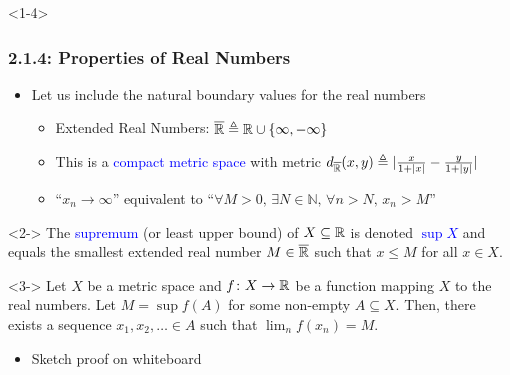 \documentclass[10pt,english,aspectratio=169]{beamer}
\begin{document}
\begin{frame}<1-4>
\frametitle{2.1.4: Properties of Real Numbers}

\begin{itemize}
\setlength\itemsep{3mm}
\item<1-> Let us include the natural boundary values for the real numbers \vspace{1mm}

\begin{itemize} 
  \setlength\itemsep{1.5mm}
  \item Extended Real Numbers: $\overline{\mathbb{R}} \triangleq \mathbb{R} \cup \{ \infty,-\infty\}$
  \item This is a \textcolor{blue}{compact metric space} with metric $d_{\overline{\mathbb{R}}} (x,y) \triangleq |\frac{x}{1+|x|} - \frac{y}{1+|y|}|$
  \item ``$x_n \to \infty$'' equivalent to ``$\forall M>0, \, \exists N\in \mathbb{N}, \, \forall n>N, \, x_n > M$''
\end{itemize}
\end{itemize}

\begin{definition}<2->
The \textcolor{blue}{supremum} (or least upper bound) of $X\subseteq \mathbb{R}$ is denoted \textcolor{blue}{$\sup X$} and equals the smallest extended real number $M \in \overline{\mathbb{R}}$ such that $x\leq M$ for all $x\in X$.
\end{definition}

\begin{lemma}<3->
Let $X$ be a metric space and $f \colon X\rightarrow \mathbb{R}$ be a function mapping $X$ to the real numbers.
Let $M = \sup f(A)$ for some non-empty $A \subseteq X$.
Then, there exists a sequence $x_1,x_2,\ldots \in A$ such that $\lim_n f(x_n) = M$.
\end{lemma}

\begin{itemize}
\item<4-> Sketch proof on whiteboard
\end{itemize}


\end{frame}
\end{document}
